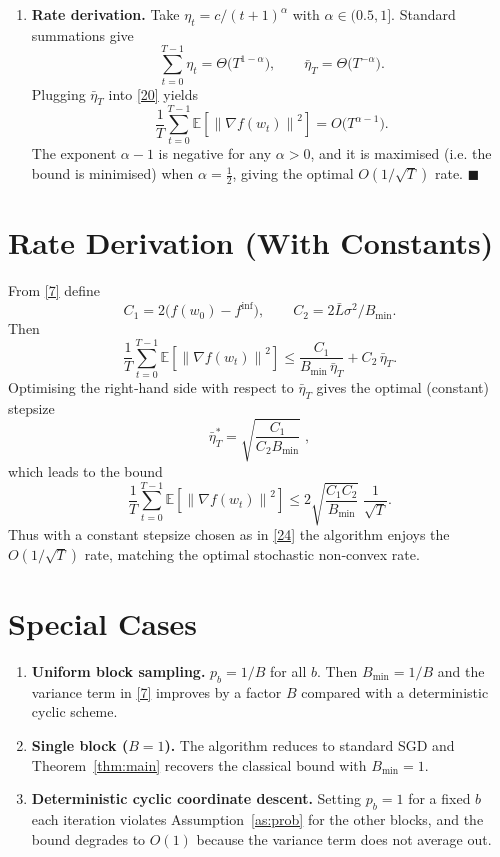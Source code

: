 \documentclass{article}
\newcommand{\E}{\mathbb{E}}
\newcommand{\norm}[1]{\left\|#1\right\|}
\begin{document}
\begin{enumerate}[label=[Step \arabic*], leftmargin=*]
\item %
\textbf{Rate derivation.}  
Take $\eta_{t}=c/(t+1)^{\alpha}$ with $\alpha\in(0.5,1]$.
Standard summations give
\[
\sum_{t=0}^{T-1}\eta_{t}= \Theta\!\bigl(T^{1-\alpha}\bigr),\qquad
\bar\eta_{T}= \Theta\!\bigl(T^{-\alpha}\bigr).
\tag{21}
\]
Plugging $\bar\eta_{T}$ into \eqref{20} yields
\[
\frac{1}{T}\sum_{t=0}^{T-1}\E\!\left[\norm{\nabla f(w_{t})}^{2}\right]
= O\!\bigl(T^{\alpha-1}\bigr).
\tag{22}
\]
The exponent $\alpha-1$ is negative for any $\alpha>0$, and it is maximised (i.e. the bound is minimised) when $\alpha=\tfrac12$, giving the optimal $O(1/\sqrt{T})$ rate.
\hfill$\blacksquare$
\end{enumerate}

\section*{Rate Derivation (With Constants)}
From \eqref{7} define
\[
C_{1}=2\bigl(f(w_{0})-f^{\inf}\bigr),\qquad
C_{2}=2\bar L\sigma^{2}/B_{\min}.
\]
Then
\[
\frac{1}{T}\sum_{t=0}^{T-1}\E\!\left[\norm{\nabla f(w_{t})}^{2}\right]
\le \frac{C_{1}}{B_{\min}\,\bar\eta_{T}}+C_{2}\,\bar\eta_{T}.
\tag{23}
\]
Optimising the right‑hand side with respect to $\bar\eta_{T}$ gives the optimal (constant) stepsize
\[
\bar\eta_{T}^{*}= \sqrt{\frac{C_{1}}{C_{2}B_{\min}}}\;,
\tag{24}
\]
which leads to the bound
\[
\frac{1}{T}\sum_{t=0}^{T-1}\E\!\left[\norm{\nabla f(w_{t})}^{2}\right]
\le 2\sqrt{\frac{C_{1}C_{2}}{B_{\min}}}\; \frac{1}{\sqrt{T}}.
\tag{25}
\]
Thus with a constant stepsize chosen as in \eqref{24} the algorithm enjoys the
$O(1/\sqrt{T})$ rate, matching the optimal stochastic non‑convex rate.

\section*{Special Cases}
\begin{enumerate}
\item \textbf{Uniform block sampling.} $p_{b}=1/B$ for all $b$. Then $B_{\min}=1/B$ and the variance term in \eqref{7} improves by a factor $B$ compared with a deterministic cyclic scheme.
\item \textbf{Single block ($B=1$).} The algorithm reduces to standard SGD and Theorem~\ref{thm:main} recovers the classical bound with $B_{\min}=1$.
\item \textbf{Deterministic cyclic coordinate descent.} Setting $p_{b}=1$ for a fixed $b$ each iteration violates Assumption~\ref{as:prob} for the other blocks, and the bound degrades to $O(1)$ because the variance term does not average out.
\end{enumerate}
\end{document}
